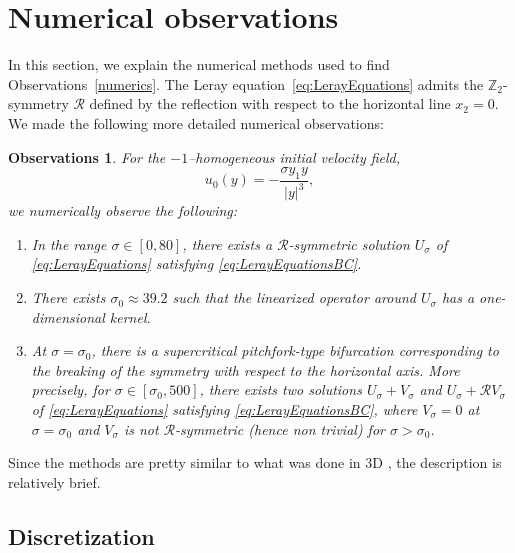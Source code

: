 \documentclass[12pt,reqno]{amsart}
\theoremstyle{plain}
\newtheorem{result}[theorem]{Observations}
\theoremstyle{definition}
\renewcommand{\:}{\colon}
\numberwithin{equation}{section}
\numberwithin{figure}{section}
\begin{document}
\section{Numerical observations}
\label{sec:numericalobservations}

In this section, we explain the numerical methods used to find Observations~\ref{numerics}.
The Leray equation~\eqref{eq:LerayEquations} admits the $\mathbb{Z}_{2}$-symmetry
$\mathcal{R}$ defined by the reflection with respect to the horizontal
line $x_{2}=0$.
We made the following more detailed numerical observations:

\begin{result}\label{numerics-detailed}
	For the $-1$--homogeneous initial velocity field,
	\begin{equation}
		u_{0}(y) = -\frac{\sigma y_{1}y}{|y|^{3}},
	\end{equation}
	we numerically observe the following:
	\begin{enumerate}
		\item In the range $\sigma\in[0,80]$, there exists a $\mathcal{R}$-symmetric
		solution $U_{\sigma}$ of \eqref{eq:LerayEquations} satisfying \eqref{eq:LerayEquationsBC}.
		\item There exists $\sigma_{0}\approx39.2$ such that the linearized operator
		around $U_{\sigma}$ has a one-dimensional kernel.
		\item At $\sigma=\sigma_{0}$, there is a supercritical pitchfork-type bifurcation
		corresponding to the breaking of the symmetry with respect to the
		horizontal axis. More precisely, for $\sigma\in[\sigma_{0},500]$,
		there exists two solutions $U_{\sigma}+V_{\sigma}$ and $U_{\sigma}+\mathcal{R}V_{\sigma}$
		of \eqref{eq:LerayEquations} satisfying \eqref{eq:LerayEquationsBC}, where $V_{\sigma}=0$
		at $\sigma=\sigma_{0}$ and $V_{\sigma}$ is not $\mathcal{R}$-symmetric
		(hence non trivial) for $\sigma>\sigma_{0}$.
	\end{enumerate}
\end{result}

Since the methods are pretty similar to what was done in 3D
\cite{guillodsverak}, the description is relatively brief.

\subsection{Discretization}
\end{document}

